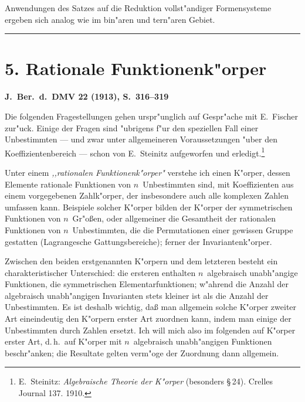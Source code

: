 \documentclass[11pt,a4paper]{article}
\begin{document}
Anwendungen des Satzes auf die Reduktion vollst"{a}ndiger Formensysteme
ergeben sich analog wie im bin"{a}ren und tern"{a}ren Gebiet.

\bigskip
\hrule
\bigskip

\section*{5. Rationale Funktionenk"{o}rper}

\textbf{J.\ Ber.\ d.\ DMV 22 (1913), S.\ 316--319}

\smallskip
\noindent
Die folgenden Fragestellungen gehen urspr"{u}nglich auf Gespr"{a}che
mit E.~Fischer zur"{u}ck. Einige der Fragen sind "{u}brigens f"{u}r den
speziellen Fall einer Unbestimmten --- und zwar unter allgemeineren
Voraussetzungen "{u}ber den Koeffizientenbereich --- schon von E.~Steinitz
aufgeworfen und erledigt.\footnote{E.~Steinitz: \emph{Algebraische Theorie der
K"{o}rper} (besonders \S\,24). Crelles Journal 137. 1910.}

Unter einem \emph{,,rationalen Funktionenk"{o}rper"{}} verstehe ich einen
K"{o}rper, dessen Elemente rationale Funktionen von $n$~Unbestimmten
sind, mit Koeffizienten aus einem vorgegebenen Zahlk"{o}rper, der insbesondere
auch alle komplexen Zahlen umfassen kann. Beispiele solcher
K"{o}rper bilden der K"{o}rper der symmetrischen Funktionen von $n$~Gr"{o}\ss{}en,
oder allgemeiner die Gesamtheit der rationalen Funktionen von $n$~Unbestimmten,
die die Permutationen einer gewissen Gruppe gestatten
(Lagrangesche Gattungsbereiche); ferner der Invariantenk"{o}rper.

Zwischen den beiden erstgenannten K"{o}rpern und dem letzteren besteht
ein charakteristischer Unterschied: die ersteren enthalten $n$~algebraisch
unabh"{a}ngige Funktionen, die symmetrischen Elementarfunktionen;
w"{a}hrend die Anzahl der algebraisch unabh"{a}ngigen Invarianten stets kleiner
ist als die Anzahl der Unbestimmten. Es ist deshalb wichtig, da\ss{} man
allgemein solche K"{o}rper zweiter Art eineindeutig den K"{o}rpern erster
Art zuordnen kann, indem man einige der Unbestimmten durch Zahlen
ersetzt. Ich will mich also im folgenden auf K"{o}rper erster Art,
d.\,h.\ auf K"{o}rper mit $n$~algebraisch unabh"{a}ngigen Funktionen
beschr"{a}nken; die Resultate gelten verm"{o}ge der Zuordnung dann allgemein.
\end{document}
